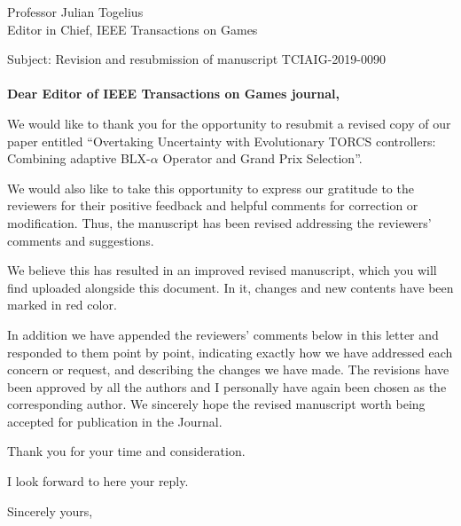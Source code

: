 \documentclass[10pt]{letter} %
\begin{document}

\begin{letter}{Professor Julian Togelius \\ Editor in Chief, IEEE Transactions on Games} %

\opening{Subject: Revision and resubmission of manuscript TCIAIG-2019-0090\\
	\\	
\textbf{Dear Editor of  IEEE Transactions on Games journal,}}


We would like to thank you for the opportunity to resubmit a revised copy of our paper entitled ``Overtaking Uncertainty with Evolutionary TORCS controllers: Combining adaptive BLX-$\alpha$ Operator and Grand Prix Selection''. 

We would also like to take this opportunity to express our gratitude to the reviewers for their positive feedback and helpful comments for correction or modification. Thus, the manuscript has been revised addressing the reviewers' comments and suggestions.

We believe this has resulted in an improved revised manuscript, which you will find uploaded alongside this document. In it, changes and new contents have been marked in red color.

In addition we have appended the reviewers' comments below in this letter and responded to them point by point, indicating exactly how we have addressed each concern or request, and describing the changes we have made. The revisions have been approved by all the authors and I personally have again been chosen as the corresponding author. 
We sincerely hope the revised manuscript worth being accepted for publication in the Journal.

Thank you for your time and consideration.

I look forward to here your reply.

\vspace{2\parskip} %
\closing{Sincerely yours,}
\vspace{2\parskip} %


\end{letter}
\end{document}
